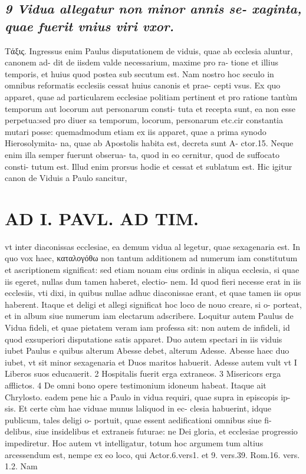 \documentclass{article}
\begin{document}
\begin{pages}
\subsection*{\textit{9 Vidua allegatur non minor annis se- xaginta, quae fuerit vnius viri vxor. }}\pstart Τάξις. Ingressus enim Paulus disputationem de viduis, quae ab ecclesia aluntur, canonem ad- dit de iisdem valde necessarium, maxime pro ra- tione et illius temporis, et huius quod postea sub secutum est. Nam nostro hoc seculo in omnibus reformatis ecclesiis cessat huius canonis et prae- cepti vsus. Ex quo apparet, quae ad particularem ecclesiae politiam pertinent et pro ratione tantùm temporum aut locorum aut personarum consti- tuta et recepta sunt, ea non esse perpetua:sed pro diuer sa temporum, locorum, personarum etc.cir constantia mutari posse: quemadmodum etiam ex iis apparet, quae a prima synodo Hierosolymita- na, quae ab Apostolis habita est, decreta sunt A- ctor.15. Neque enim illa semper fuerunt obserua- ta, quod in eo cernitur, quod de suffocato consti- tutum est. Illud enim prorsus hodie et cessat et sublatum est.  \pend\pstart Hic igitur canon de Viduis a Paulo sancitur,  \pend
\section*{AD I. PAVL. AD TIM. }
\marginpar{[ p.279 ]}\pstart vt inter diaconissas ecclesiae, ea demum vidua al legetur, quae sexagenaria est. In quo vox haec, καταλογόθω non tantum additionem ad numerum iam constitutum et ascriptionem significat: sed etiam nouam eius ordinis in aliqua ecclesia, si quae iis egeret, nullas dum tamen haberet, electio- nem. Id quod fieri necesse erat in iis ecclesiis, vti dixi, in quibus nullae adhuc diaconissae erant, et quae tamen iis opus haberent. Itaque et deligi et allegi significat hoc loco de nouo creare, si o- porteat, et in album siue numerum iam electarum adscribere.  \pend\pstart Loquitur autem Paulus de Vidua fideli, et quae pietatem veram iam professa sit: non autem de infideli, id quod exsuperiori disputatione satis apparet.  \pend\pstart Duo autem spectari in iis viduis iubet Paulus e quibus alterum Abesse debet, alterum Adesse. Abesse haec duo iubet, vt sit minor sexagenaria et Duos maritos habuerit. Adesse autem vult vt I Liberos suos educauerit. 2 Hospitalis fuerit erga extraneos. 3 Misericors erga afflictos. 4 De omni bono opere testimonium idoneum habeat. Itaque ait Chrylosto. eadem pene hic a Paulo in vidua requiri, quae supra in episcopis ip- sis. Et certe cùm hae viduae munus laliquod in ec- clesia habuerint, idque publicum, tales deligi o- portuit, quae essent aedificationi omnibus siue fi- delibus, siue insidelibus et extraneis futurae: ne Dei gloria, et ecclesiae progressio impediretur.  \pend\pstart Hoc autem vt intelligatur, totum hoc argumem tum altius arcessendum est, nempe ex eo loco, qui Actor.6.vers1. et 9. vers.39. Rom.16. vers. 1.2. Nam  \pend

\end{pages}
\end{document}
